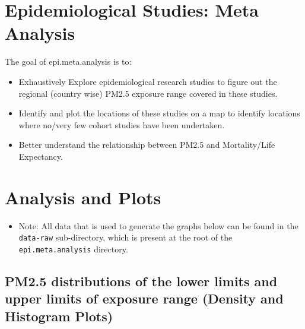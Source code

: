 \documentclass[
]{article}
\author{}
\date{\vspace{-2.5em}}
\providecommand{\tightlist}{%
  \setlength{\itemsep}{0pt}\setlength{\parskip}{0pt}}
\begin{document}
\hypertarget{epidemiological-studies-meta-analysis}{%
\section{Epidemiological Studies: Meta
Analysis}\label{epidemiological-studies-meta-analysis}}

The goal of epi.meta.analysis is to:

\begin{itemize}
\tightlist
\item
  Exhaustively Explore epidemiological research studies to figure out
  the regional (country wise) PM2.5 exposure range covered in these
  studies.
\item
  Identify and plot the locations of these studies on a map to identify
  locations where no/very few cohort studies have been undertaken.
\item
  Better understand the relationship between PM2.5 and Mortality/Life
  Expectancy.
\end{itemize}

\newpage

\hypertarget{analysis-and-plots}{%
\section{Analysis and Plots}\label{analysis-and-plots}}

\begin{itemize}
\tightlist
\item
  Note: All data that is used to generate the graphs below can be found
  in the \texttt{data-raw} sub-directory, which is present at the root
  of the \texttt{epi.meta.analysis} directory.
\end{itemize}

\hypertarget{pm2.5-distributions-of-the-lower-limits-and-upper-limits-of-exposure-range-density-and-histogram-plots}{%
\subsection{PM2.5 distributions of the lower limits and upper limits of
exposure range (Density and Histogram
Plots)}\label{pm2.5-distributions-of-the-lower-limits-and-upper-limits-of-exposure-range-density-and-histogram-plots}}
\end{document}
